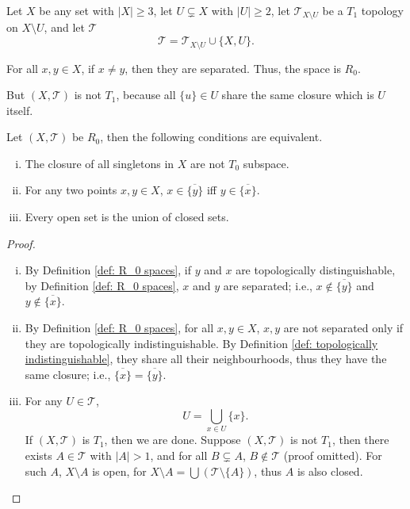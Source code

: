 \begin{example}
	\label{eg: R_0 but not T_1}

	Let $X$ be any set with $|X| \ge 3$, let $U \subsetneq X$ with $|U| \ge 2$, let $\mathcal T_{X \setminus U}$ be a $T_1$ topology on $X \setminus U$, and let $\mathcal T$
	$$
	\mathcal T = \mathcal T_{X \setminus U} \cup \{X, U\}.
	$$

	For all $x,y \in X$, if $x \ne y$, then they are separated. Thus, the space is $R_0$.

	But $(X, \mathcal T)$ is not $T_1$, because all $\{u\} \in U$ share the same closure which is $U$ itself.
\end{example}


\begin{corollary}
	\label{prop: alternative definitions of R_0 spaces}
	Let $(X, \mathcal T)$ be $R_0$, then the following conditions are equivalent.
	\begin{enumerate}[(i)]
		\item
		The closure of all singletons in $X$ are not $T_0$ subspace.

		\item
		For any two points $x,y \in X$, $x \in \overline{ \{y\} }$ iff $y \in \overline{ \{x\} }$.

		\item
		Every open set is the union of closed sets.
	\end{enumerate}

	\begin{proof}
		\
		\begin{enumerate}[(i)]
			\item
			By Definition \ref{def: R_0 spaces}, if $y$ and $x$ are topologically distinguishable, by Definition \ref{def: R_0 spaces}, $x$ and $y$ are separated; i.e., $x \notin \overline {\{y\}}$ and $y \notin \overline{\{x\}}$.

			\item
			By Definition \ref{def: R_0 spaces}, for all $x,y \in X$, $x,y$ are not separated only if they are topologically indistinguishable. By Definition \ref{def: topologically indistinguishable}, they share all their neighbourhoods, thus they have the same closure; i.e., $\overline{\{x\}} = \overline{\{y\}}$.

			\item
			For any $U \in \mathcal T$,
			$$
			U = \bigcup_{x \in U} \{x\}.
			$$
			If $(X, \mathcal T)$ is $T_1$, then we are done. Suppose $(X, \mathcal T)$ is not $T_1$, then there exists $A \in \mathcal T$ with $|A| > 1$, and for all $B \subsetneq A$, $B \notin \mathcal T$ (proof omitted). For such $A$, $X \setminus A$ is open, for $X \setminus A = \bigcup (\mathcal T \setminus \{A\})$, thus $A$ is also closed.


\end{enumerate}
\end{proof}
\end{corollary}
